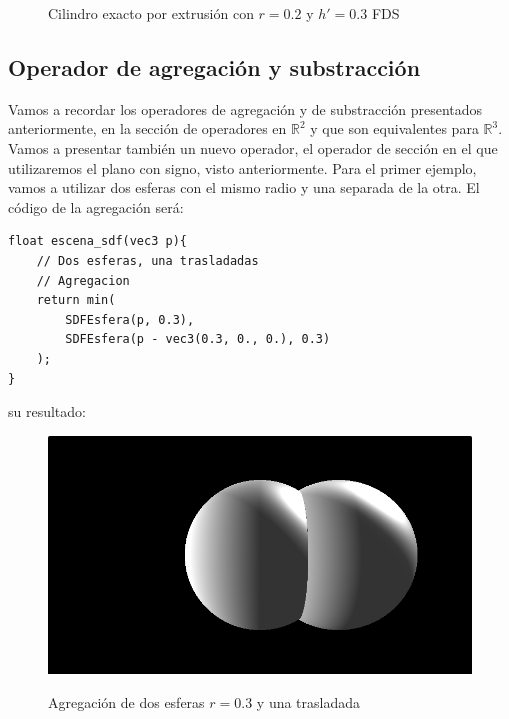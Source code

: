 \begin{figure}[H]
  \centering
  \captionsetup{justification=centering}%
  \hfill
  \caption{Cilindro exacto por extrusión con \(r=0.2\) y \(h'=0.3\)  FDS}
\end{figure}

\subsection{Operador de agregación y substracción}
Vamos a recordar los operadores de agregación y de substracción presentados anteriormente, en la sección de operadores en \(\mathbb{R}^2\) y que son equivalentes para \(\mathbb{R}^3\). Vamos a presentar también un nuevo operador, el operador de sección en el que utilizaremos el plano con signo, visto anteriormente. Para el primer ejemplo, vamos a utilizar dos esferas con el mismo radio y una separada de la otra. El código de la agregación será:
\begin{lstlisting}
float escena_sdf(vec3 p){
    // Dos esferas, una trasladadas
    // Agregacion
    return min(
        SDFEsfera(p, 0.3),
        SDFEsfera(p - vec3(0.3, 0., 0.), 0.3)
    );
}
\end{lstlisting}
su resultado:
\begin{figure}[H]
  \centering
  \captionsetup{justification=centering}%
  \includegraphics[width=1.0\textwidth]{secciones/imagenes/sdf/3d/sdf_add_3d.png}\label{fig:add3d}
  \caption{Agregación de dos esferas \(r=0.3\) y una trasladada}
\end{figure}

